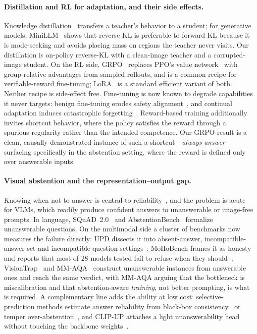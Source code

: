 \documentclass[10pt,twocolumn,letterpaper]{article}
\begin{document}
\paragraph{Distillation and RL for adaptation, and their side effects.}
Knowledge distillation~\cite{hinton2015distilling} transfers a teacher's behavior to a
student; for generative models, MiniLLM~\cite{gu2024minillm} shows that reverse KL is
preferable to forward KL because it is mode-seeking and avoids placing mass on regions
the teacher never visits. Our distillation is on-policy reverse-KL with a clean-image
teacher and a corrupted-image student. On the RL side, GRPO~\cite{shao2024deepseekmath}
replaces PPO's value network~\cite{schulman2017ppo} with group-relative advantages from
sampled rollouts, and is a common recipe for verifiable-reward fine-tuning;
LoRA~\cite{hu2022lora} is a standard efficient variant of both. Neither recipe is
side-effect free. Fine-tuning is now known to degrade capabilities it never targets:
benign fine-tuning erodes safety alignment~\cite{qi2024finetuning}, and continual
adaptation induces catastrophic forgetting~\cite{luo2023empirical}. Reward-based training
additionally invites shortcut behavior, where the policy satisfies the reward through a
spurious regularity rather than the intended competence. Our GRPO result is a clean,
causally demonstrated instance of such a shortcut---\emph{always answer}---surfacing
specifically in the abstention setting, where the reward is defined only over answerable
inputs.

\paragraph{Visual abstention and the representation--output gap.}
Knowing when not to answer is central to reliability~\cite{geifman2017selective}, and the
problem is acute for VLMs, which readily produce confident answers to unanswerable or
image-free prompts. In language, SQuAD~2.0~\cite{rajpurkar2018squad2} and
AbstentionBench~\cite{kirichenko2025abstentionbench} formalize unanswerable questions. On
the multimodal side a cluster of benchmarks now measures the failure directly: UPD
dissects it into absent-answer, incompatible-answer-set and incompatible-question
settings~\cite{miyai2024upd}; MoHoBench frames it as honesty and reports that most of $28$
models tested fail to refuse when they should~\cite{zhu2025mohobench};
VisionTrap~\cite{saadat2025visiontrap} and MM-AQA~\cite{madhusudhan2026knowing} construct
unanswerable instances from answerable ones and reach the same verdict, with MM-AQA
arguing that the bottleneck is miscalibration and that abstention-aware \emph{training},
not better prompting, is what is required. A complementary line adds the ability at low
cost: selective-prediction methods estimate answer reliability from black-box
consistency~\cite{khan2024consistency} or temper over-abstention~\cite{srinivasan2024recoverr},
and CLIP-UP attaches a light unanswerability head without touching the backbone
weights~\cite{vardi2025clipup}.
\end{document}
